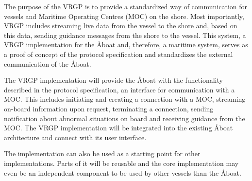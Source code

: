 The purpose of the VRGP is to provide a standardized way of communication for vessels and Maritime Operating Centres (MOC) on the shore. Most importantly, VRGP includes streaming live data from the vessel to the shore and, based on this data, sending guidance messages from the shore to the vessel. This system, a VRGP implementation for the Åboat and, therefore, a maritime system, serves as a proof of concept of the protocol specification and standardizes the external communication of the Åboat.

The VRGP implementation will provide the Åboat with the functionality described in the protocol specification, an interface for communication with a MOC. This includes initiating and creating a connection with a MOC, streaming on-board information upon request, terminating a connection, sending notification about abnormal situations on board and receiving guidance from the MOC. The VRGP implementation will be integrated into the existing Åboat architecture and connect with its user interface.

The implementation can also be used as a starting point for other implementations. Parts of it will be reusable and the core implementation may even be an independent component to be used by other vessels than the Åboat.
